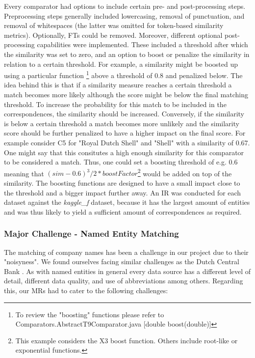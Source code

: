 \documentclass[11pt,titlepage,oneside,openany]{article}
\begin{document}
 Every comparator had options to include certain pre- and post-processing steps. Preprocessing steps generally included lowercasing, removal of punctuation, and removal of whitespaces (the latter was omitted for token-based similarity metrics). Optionally, FTs could be removed. Moreover, different optional post-processing capabilities were implemented. These included a threshold after which the similarity was set to zero, and an option to boost or penalize the similarity in relation to a certain threshold. For example, a similarity might be boosted up using a particular function%
\footnote{To review the "boosting" functions please refer to Comparators.AbstractT9Comparator.java [double boost(double)]} %
 above a threshold of 0.8 and penalized below. The idea behind this is that if a similarity measure reaches a certain threshold a match becomes more likely although the score might be below the final matching threshold. To increase the probability for this match to be included in the correspondences, the similarity should be increased. Conversely, if the similarity is below a certain threshold a match becomes more unlikely and the similarity score should be further penalized to have a higher impact on the final score. For example consider C5 for "Royal Dutch Shell" and "Shell" with a similarity of 0.67. One might say that this consitutes a high enough similarity for this comparator to be considered a match. Thus, one could set a boosting threshold of e.g. 0.6 meaning that $(sim - 0.6)^3/2*boostFactor$\footnote{This example considers the X3 boost function. Others include root-like or exponential functions.} would be added on top of the similarity. The boosting functions are designed to have a small impact close to the threshold and a bigger impact further away. 
An IR was conducted for each dataset against the \textit{kaggle\_f} dataset, because it has the largest amount of entities and was thus likely to yield a sufficient amount of correspondences as required.




\subsubsection{Major Challenge - Named Entity Matching}
\label{sec:challenges}

The matching of company names has been a challenge in our project due to their "noisyness". We found ourselves facing similar challenges as the Dutch Central Bank \citep{nijhuis_company_2022}. As with named entities in general every data source has a different level of detail, different data quality, and use of abbreviations among others. Regarding this, our MRs had to cater to the following challenges:
\end{document}
